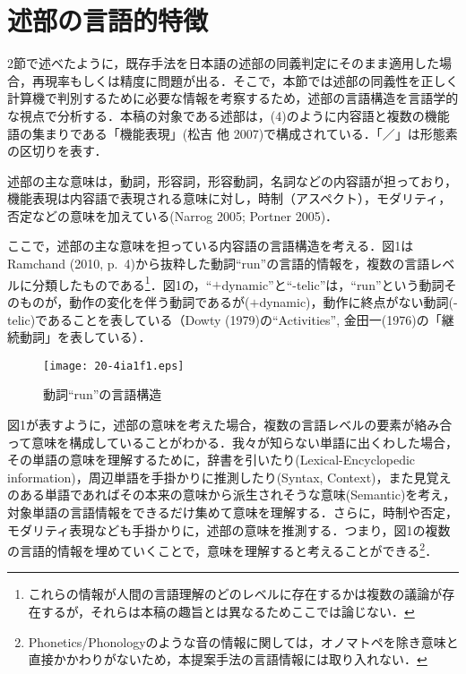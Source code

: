 \documentclass[japanese]{jnlp_1.4}
\begin{document}
\section{述部の言語的特徴}

2節で述べたように，既存手法を日本語の述部の同義判定にそのまま適用した場合，再現率もしくは精度に問題が出る．そこで，本節では述部の同義性を正しく計算機で判別するために必要な情報を考察するため，述部の言語構造を言語学的な視点で分析する．本稿の対象である述部は，(4)のように内容語と複数の機能語の集まりである「機能表現」(松吉 他 2007)で構成されている．「／」は形態素の区切りを表す．

述部の主な意味は，動詞，形容詞，形容動詞，名詞などの内容語が担っており，機能表現は内容語で表現される意味に対し，時制（アスペクト），モダリティ，否定などの意味を加えている(Narrog 2005; Portner 2005)．

ここで，述部の主な意味を担っている内容語の言語構造を考える．図1はRamchand (2010, p.~4)から抜粋した動詞``run''の言語的情報を，複数の言語レベルに分類したものである\footnote{これらの情報が人間の言語理解のどのレベルに存在するかは複数の議論が存在するが，それらは本稿の趣旨とは異なるためここでは論じない．}．図1の，``$+$dynamic''と``-telic''は，``run''という動詞そのものが，動作の変化を伴う動詞であるが($+$dynamic)，動作に終点がない動詞(-telic)であることを表している（Dowty (1979)の``Activities'', 金田一(1976)の「継続動詞」を表している）．

\begin{figure}[b]
\begin{center}
\texttt{[image: 20-4ia1f1.eps]}
\end{center}
\caption{動詞``run''の言語構造}
\end{figure}

図1が表すように，述部の意味を考えた場合，複数の言語レベルの要素が絡み合って意味を構成していることがわかる．我々が知らない単語に出くわした場合，その単語の意味を理解するために，辞書を引いたり(Lexical-Encyclopedic information)，周辺単語を手掛かりに推測したり(Syntax, Context)，また見覚えのある単語であればその本来の意味から派生されそうな意味(Semantic)を考え，対象単語の言語情報をできるだけ集めて意味を理解する．さらに，時制や否定，モダリティ表現なども手掛かりに，述部の意味を推測する．つまり，図1の複数の言語的情報を埋めていくことで，意味を理解すると考えることができる\footnote{Phonetics/Phonologyのような音の情報に関しては，オノマトペを除き意味と直接かかわりがないため，本提案手法の言語情報には取り入れない．}．
\end{document}
